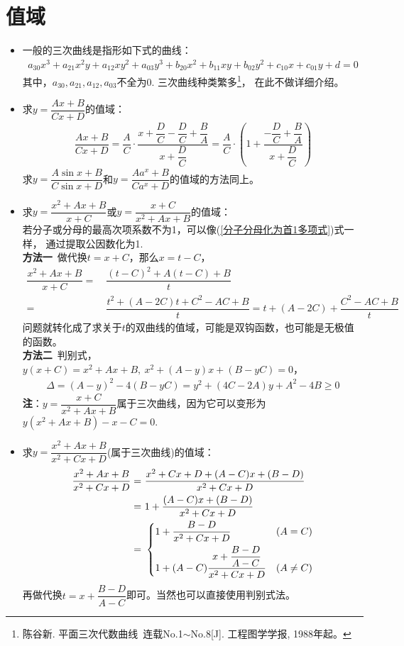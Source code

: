\section{值域} 
\begin{itemize}[leftmargin=\inteval{\myitemleftmargin}pt,itemsep=
   \inteval{\myitemitempsep}pt,topsep=\inteval{\myitemtopsep}pt]
\item 一般的三次曲线是指形如下式的曲线：
\begin{gather*}
    a_{30}x^3+a_{21}x^2y+a_{12}xy^2+a_{03}y^3+b_{20}x^2+b_{11}xy+b_{02}y^2+
    c_{10}x+c_{01}y+d=0
\end{gather*}
其中，$ a_{30},a_{21},a_{12},a_{03} $不全为0. 三次曲线种类繁多\footnote{陈谷新. 
    平面三次代数曲线\ 连载No.1$ \sim $No.8[J]. 工程图学学报, 1988年起。}，
在此不做详细介绍。

\item 求$ y=\dfrac{Ax+B}{Cx+D} $的值域：
\begin{align}\label{分子分母化为首1多项式}
    \dfrac{Ax+B}{Cx+D} =
    \dfrac{A}{C}\cdot\dfrac{x+\dfrac{D}{C}-\dfrac{D}{C}+\dfrac{B}{A}}
    {x+\dfrac{D}{C}}=\dfrac{A}{C}\cdot
    \left(1+\dfrac{-\dfrac{D}{C}+\dfrac{B}{A}}{x+\dfrac{D}{C}}\right)
\end{align}
求$ y=\dfrac{A\sin x+B}{C\sin x+D}$和$ y=\dfrac{Aa^x+B}{Ca^x+D}$的值域的方法同上。

\item 求$ y=\dfrac{x^2+Ax+B}{x+C} $或$ y=\dfrac{x+C}{x^2+Ax+B} $的值域：\\
若分子或分母的最高次项系数不为1，可以像(\ref{分子分母化为首1多项式})式一样，
通过提取公因数化为1. \\
\textbf{方法一}\ 做代换$ t=x+C $，那么$ x=t-C $，
\begin{align*}
    \dfrac{x^2+Ax+B}{x+C}=&\ \dfrac{(t-C)^2+A(t-C)+B}{t}\\
    =&\ \dfrac{t^2+(A-2C)t+C^2-AC+B}{t}=t+(A-2C)+\dfrac{C^2-AC+B}{t}
\end{align*}
问题就转化成了求关于$ t $的双曲线的值域，可能是双钩函数，也可能是无极值的函数。\\
\textbf{方法二}\ 判别式，$ y(x+C)=x^2+Ax+B,\ x^2+(A-y)x+(B-yC)=0 $，
\begin{align*}
    \Delta=(A-y)^2-4(B-yC)=y^2+(4C-2A)y+A^2-4B\geq 0 
\end{align*}
\textbf{注}：$ y=\dfrac{x+C}{x^2+Ax+B} $属于三次曲线，因为它可以变形为$ y(x^2+Ax+B)-x-C=0 $. 

\item 求$ y=\dfrac{x^2+Ax+B}{x^2+Cx+D} $(属于三次曲线)的值域：
\begin{align*}
    \dfrac{x^2+Ax+B}{x^2+Cx+D} =&\  \dfrac{x^2+Cx+D+(A-C)x+(B-D)}{x^2+Cx+D} \\
    =&\ 1+\dfrac{(A-C)x+(B-D)}{x^2+Cx+D}  \\
    =&\ \begin{dcases}
         1+\dfrac{B-D}{x^2+Cx+D} & (A = C) \\
         1+(A-C)\dfrac{x+\dfrac{B-D}{A-C}}{x^2+Cx+D} & (A\neq C)
    \end{dcases}
\end{align*}
再做代换$ t=x+\dfrac{B-D}{A-C} $即可。当然也可以直接使用判别式法。


\end{itemize}
